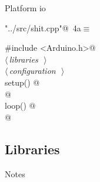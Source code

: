 \documentclass[a4paper, 12pt]{article}
\begin{document}
Platform io

\begin{flushleft} \small
\begin{minipage}{\linewidth}\label{scrap2}\raggedright\small
{}\verb@"../src/shit.cpp"@\nobreak\ {\footnotesize{4a}}$\equiv$
\vspace{-1ex}
\begin{list}{}{\setlength{\leftmargin}{1em}} \item
\mbox{}\verb@#include <Arduino.h>@\\
\mbox{}\verb@@$\langle\,${\itshape libraries}\ {\footnotesize {}}\,$\rangle\,$\verb@@\\
\mbox{}\verb@@$\langle\,${\itshape configuration}\ {\footnotesize {}}\,$\rangle\,$\verb@@\\
\mbox{}\verb@void setup() @\\
\mbox{}@\\
\mbox{}\verb@void loop() @\\
\mbox{}@\\
\mbox{}{\NWsep}
\end{list}
\vspace{-1ex}
\end{minipage}
\end{flushleft}


\subsection{Libraries}

Notes
\end{document}
